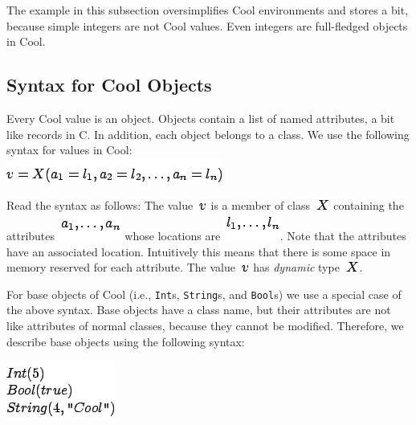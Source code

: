 \documentclass[]{article}
\begin{document}
The example in this subsection oversimplifies Cool environments and
stores a bit, because simple integers are not Cool values. Even integers
are full-fledged objects in Cool.

\subsection{Syntax for Cool Objects}

Every Cool value is an object. Objects contain a list of named
attributes, a bit like records in C. In addition, each object belongs to
a class. We use the following syntax for values in Cool: \\

\includegraphics{img140.png}

Read the syntax as follows: The value \includegraphics{img59.png} is a
member of class \includegraphics{img141.png} containing the attributes
\includegraphics{img142.png} whose locations are
\includegraphics{img143.png}. Note that the attributes have an
associated location. Intuitively this means that there is some space in
memory reserved for each attribute. The value
\includegraphics{img59.png} has \emph{dynamic} type
\includegraphics{img141.png}.

For base objects of Cool (i.e., \texttt{Int}s, \texttt{String}s, and
\texttt{Bool}s) we use a special case of the above syntax. Base objects
have a class name, but their attributes are not like attributes of
normal classes, because they cannot be modified. Therefore, we describe
base objects using the following syntax:

\includegraphics{img144.png}
\end{document}

